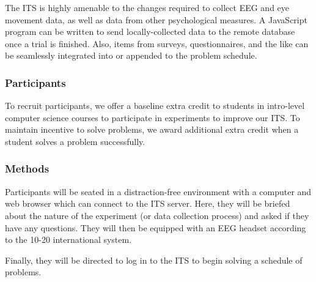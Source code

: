 \documentclass[hidelinks,11pt]{article}
\begin{document}
The ITS is highly amenable to the changes required to collect EEG and eye
movement data, as well as data from other psychological measures. A JavaScript
program can be written to send locally-collected data to the remote database
once a trial is finished.  Also, items from surveys, questionnaires, and the
like can be seamlessly integrated into or appended to the problem schedule.

\subsubsection{ Participants }

To recruit participants, we offer a baseline extra credit to students in
intro-level computer science courses to participate in experiments to improve
our ITS.  To maintain incentive to solve problems, we award additional extra
credit when a student solves a problem successfully.


\subsubsection{ Methods }

Participants will be seated in a distraction-free environment with a computer
and web browser which can connect to the ITS server.  Here, they will be
briefed about the nature of the experiment (or data collection process) and
asked if they have any questions. They will then be equipped with an EEG
headset according to the 10-20 international system.  


Finally, they will be directed to log in to the ITS to begin solving a schedule
of problems.
\end{document}
